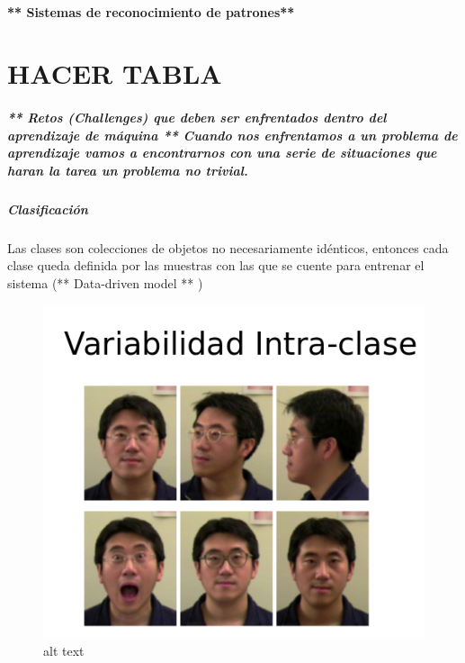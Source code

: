 \documentclass[11pt]{article}
\makeatletter
\def\maxwidth{\ifdim\Gin@nat@width>\linewidth\linewidth
    \else\Gin@nat@width\fi}
\let\Oldincludegraphics\includegraphics
\renewcommand{\includegraphics}[1]{\Oldincludegraphics[width=.8\maxwidth]{#1}}
\makeatother
\begin{document}
    \paragraph{** Sistemas de reconocimiento de
patrones**}\label{sistemas-de-reconocimiento-de-patrones}

    \section{HACER TABLA}\label{hacer-tabla}

    \subparagraph{** Retos (Challenges) que deben ser enfrentados dentro del
aprendizaje de máquina ** Cuando nos enfrentamos a un problema de
aprendizaje vamos a encontrarnos con una serie de situaciones que haran
la tarea un problema no
trivial.}\label{retos-challenges-que-deben-ser-enfrentados-dentro-del-aprendizaje-de-muxe1quina-cuando-nos-enfrentamos-a-un-problema-de-aprendizaje-vamos-a-encontrarnos-con-una-serie-de-situaciones-que-haran-la-tarea-un-problema-no-trivial.}

    \subparagraph{\texorpdfstring{\textbf{Clasificación}}{Clasificación}}\label{clasificaciuxf3n}

    Las clases son colecciones de objetos no necesariamente idénticos,
entonces cada clase queda definida por las muestras con las que se
cuente para entrenar el sistema (** Data-driven model ** )

    \begin{figure}[htbp]
\centering
\includegraphics{./Images/ICVariability.png}
\caption{alt text}
\end{figure}
\end{document}
